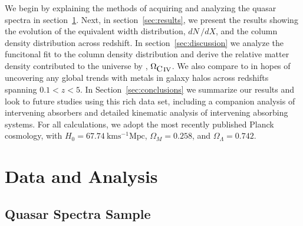 \documentclass[linenumbers,twocolumn]{aastex61}
\begin{document}
We begin by explaining the methods of acquiring and analyzing the quasar spectra in section~\ref{sec:data}. Next, in section~\ref{sec:results}, we present the results showing the evolution of the {\CIV} equivalent width distribution, $dN\,/dX$, and the {\CIV} column density distribution across redshift. In section~\ref{sec:discussion} we analyze the funcitonal fit to the column density distribution and derive the relative matter density contributed to the universe by {\CIV}, $\Omega_{\hbox{{\rm C}\kern 0.1em{\sc iv}}}$. We also compare {\CIV} to {\MgII} in hopes of uncovering any global trends with metals in galaxy halos across redshifts spanning $0.1 < z < 5$. In Section~\ref{sec:conclusions} we summarize our results and look to future studies using this rich data set, including a companion analysis of intervening {\CIV} absorbers and detailed kinematic analysis of intervening absorbing systems. For all calculations, we adopt the most recently published Planck cosmology, with $H_0 = 67.74~\mathrm{km s^{-1} Mpc}$, $\Omega_M = 0.258$, and $\Omega_{\Lambda} = 0.742$.


\section{Data and Analysis}
\label{sec:data}

\subsection{Quasar Spectra Sample}
\label{sec:sample}
\end{document}
